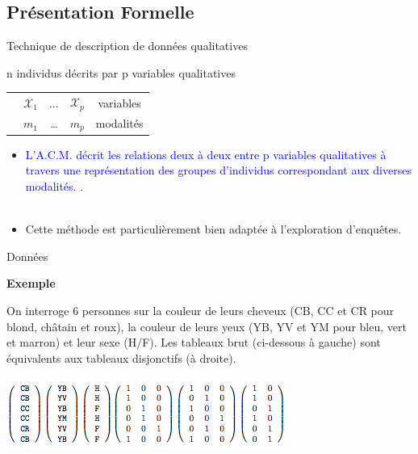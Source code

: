 \documentclass[11pt]{beamer}
\begin{document}





\subsection{Présentation Formelle}

\begin{frame}{Technique de description de données qualitatives}

n individus décrits par p variables qualitatives\\

\begin{table}
\begin{tabular}{ccccc}

 & $\mathcal{X}_1$& $\ldots$ & $ \mathcal{X}_p$& variables \\
 & $m_1$ & \ldots  &$m_p$ & modalités 
 
\end{tabular} 
\end{table}

\begin{itemize}
\item \textcolor{blue}{L'A.C.M. décrit les relations deux à deux entre p variables qualitatives à travers une représentation des groupes d'individus correspondant aux diverses modalités.} .\\~\\

\item Cette méthode est particulièrement bien adaptée à l'exploration d'enquêtes.
\end{itemize}

\end{frame}



\begin{frame}{Données  }

\textbf{Exemple} 

On interroge 6 personnes sur la couleur de leurs
cheveux (CB, CC et CR pour blond, châtain et roux), la couleur
de leurs yeux (YB, YV et YM pour bleu, vert et marron) et leur
sexe (H/F).   Les tableaux brut (ci-dessous à gauche) sont équivalents aux tableaux disjonctifs (à droite).\\~\\

\centering 
\includegraphics[scale=0.8]{disj.png} 


\end{frame}
\end{document}
